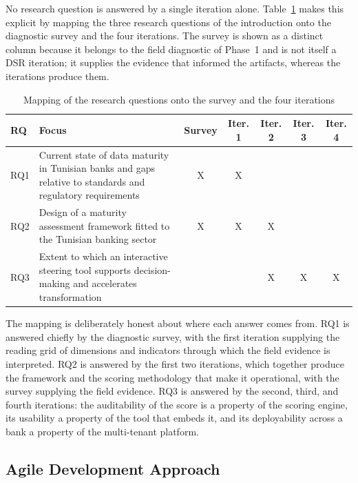 No research question is answered by a single iteration alone. Table~\ref{tab:rq-iterations} makes this explicit by mapping the three research questions of the introduction onto the diagnostic survey and the four iterations. The survey is shown as a distinct column because it belongs to the field diagnostic of Phase~1 and is not itself a DSR iteration; it supplies the evidence that informed the artifacts, whereas the iterations produce them.

\begin{table}[H]
\centering
\caption{Mapping of the research questions onto the survey and the four iterations} \label{tab:rq-iterations}

\footnotesize
\setlength{\tabcolsep}{4pt}
\begin{tabular}{|p{1.0cm}|p{6.8cm}|c|c|c|c|c|}
\hline
\textbf{RQ} & \textbf{Focus} & \textbf{Survey} & \textbf{Iter. 1} & \textbf{Iter. 2} & \textbf{Iter. 3} & \textbf{Iter. 4} \\
\hline
RQ1 & Current state of data maturity in Tunisian banks and gaps relative to standards and regulatory requirements & X & X & & & \\
\hline
RQ2 & Design of a maturity assessment framework fitted to the Tunisian banking sector & X & X & X & & \\
\hline
RQ3 & Extent to which an interactive steering tool supports decision-making and accelerates transformation & & & X & X & X \\
\hline
\end{tabular}

\end{table}

The mapping is deliberately honest about where each answer comes from. RQ1 is answered chiefly by the diagnostic survey, with the first iteration supplying the reading grid of dimensions and indicators through which the field evidence is interpreted. RQ2 is answered by the first two iterations, which together produce the framework and the scoring methodology that make it operational, with the survey supplying the field evidence. RQ3 is answered by the second, third, and fourth iterations: the auditability of the score is a property of the scoring engine, its usability a property of the tool that embeds it, and its deployability across a bank a property of the multi-tenant platform.

\subsection{Agile Development Approach}

